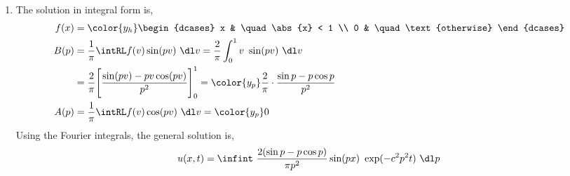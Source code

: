 \begin{enumerate}
    \item The solution in integral form is,
          \begin{align}
              f(x) & = \color{y_h} \begin{dcases}
                                       x & \quad \abs{x} < 1      \\
                                       0 & \quad \text{otherwise}
                                   \end{dcases}                \\
              B(p) & = \frac{1}{\pi} \intRL f(v) \sin(pv)\ \dl v
              = \frac{2}{\pi} \int_{0}^{1} v\ \sin(pv)\ \dl v                \\
                   & = \frac{2}{\pi} \Bigg[\frac{\sin(pv) - pv\cos(pv)}{p^2}
                  \Bigg]_0^1
              = \color{y_p} \frac{2}{\pi} \cdot \frac{\sin p- p\cos p}
              {p^2}                                                          \\
              A(p) & = \frac{1}{\pi} \intRL f(v) \cos(pv)\ \dl v
              = \color{y_p} 0
          \end{align}
          Using the Fourier integrals, the general solution is,
          \begin{align}
              u(x, t) = \infint\ \frac{2(\sin p - p\cos p)}{\pi p^2} \sin(px)
              \ \exp(-c^2p^2 t)\ \dl p
          \end{align}


\end{enumerate}

